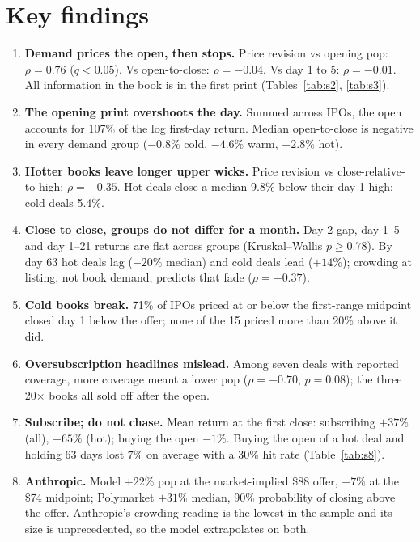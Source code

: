 \documentclass[11pt]{article}
\begin{document}
\section*{Key findings}
\begin{enumerate}[leftmargin=1.4em]
\item \textbf{Demand prices the open, then stops.} Price revision vs opening pop: $\rho=0.76$ ($q<0.05$). Vs open-to-close: $\rho=-0.04$. Vs day 1 to 5: $\rho=-0.01$. All information in the book is in the first print (Tables~\ref{tab:s2}, \ref{tab:s3}).
\item \textbf{The opening print overshoots the day.} Summed across IPOs, the open accounts for 107\% of the log first-day return. Median open-to-close is negative in every demand group ($-0.8\%$ cold, $-4.6\%$ warm, $-2.8\%$ hot).
\item \textbf{Hotter books leave longer upper wicks.} Price revision vs close-relative-to-high: $\rho=-0.35$. Hot deals close a median 9.8\% below their day-1 high; cold deals 5.4\%.
\item \textbf{Close to close, groups do not differ for a month.} Day-2 gap, day 1--5 and day 1--21 returns are flat across groups (Kruskal--Wallis $p\ge0.78$). By day 63 hot deals lag ($-20\%$ median) and cold deals lead ($+14\%$); crowding at listing, not book demand, predicts that fade ($\rho=-0.37$).
\item \textbf{Cold books break.} 71\% of IPOs priced at or below the first-range midpoint closed day 1 below the offer; none of the 15 priced more than 20\% above it did.
\item \textbf{Oversubscription headlines mislead.} Among seven deals with reported coverage, more coverage meant a lower pop ($\rho=-0.70$, $p=0.08$); the three 20$\times$ books all sold off after the open.
\item \textbf{Subscribe; do not chase.} Mean return at the first close: subscribing $+37\%$ (all), $+65\%$ (hot); buying the open $-1\%$. Buying the open of a hot deal and holding 63 days lost $7\%$ on average with a 30\% hit rate (Table~\ref{tab:s8}).
\item \textbf{Anthropic.} Model $+22\%$ pop at the market-implied \$88 offer, $+7\%$ at the \$74 midpoint; Polymarket $+31\%$ median, 90\% probability of closing above the offer. Anthropic's crowding reading is the lowest in the sample and its size is unprecedented, so the model extrapolates on both.
\end{enumerate}
\end{document}
